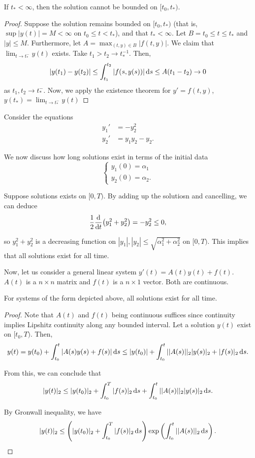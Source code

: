 \documentclass{article}
\begin{document}
\begin{theorem}[Claim.]{}
    If $t_* < \infty$, then the solution cannot be bounded on $[t_0, t_*)$.
\end{theorem}
\begin{proof}
    Suppose the solution remains bounded on $[t_0, t_*)$ (that is, $\sup|y(t)| = M < \infty$ on $t_0 \leq t < t_*$), and that $t_* < \infty$. Let $B = t_0 \leq t \leq t_*$ and $|y| \leq M$. Furthermore, let $A = \max_{(t, y) \in B} |f(t, y)|$. We claim that $\lim_{t \to t_*^{-}} y(t)$ exists. Take $t_1 > t_2 \to t_*^{-1}$. Then, 
    \[
        |y(t_1) - y(t_2)| \leq \int_{t_1}^{t_2} |f(s, y(s))| \, \text{d}s \leq A(t_1 - t_2) \to 0
    \]
    as $t_1, t_2 \to t_*^{-}$. Now, we apply the existence theorem for $y' = f(t, y)$, $y(t_*) = \lim_{t \to t_*^{-}} y(t)$
\end{proof}

\begin{example}
    Consider the equations
    \begin{align*}
        y_1' &= -y_2^2 \\
        y_2' &= y_1 y_2 - y_2.
    \end{align*}

    We now discuss how long solutions exist in terms of the initial data
    \[
        \begin{cases}
            y_1(0) = \alpha_1 \\
            y_2(0) = \alpha_2.
        \end{cases}
    \]

    Suppose solutions exists on $[0, T)$. By adding up the solutiosn and cancelling, we can deduce 
    \[
        \frac{1}{2} \dv{t} (y_1^2 + y_2^2) = -y_2^2 \leq 0,
    \]

    so $y_1^2 + y_2^2$ is a decreasing function on $|y_1|, |y_2| \leq \sqrt{\alpha_1^2 + \alpha_2^2}$ on $[0, T)$. This implies that all solutions exist for all time. 
\end{example}


Now, let us consider a general linear system $y'(t) = A(t) y(t) + f(t)$. $A(t)$ is a $n \times n$ matrix and $f(t)$ is a $n \times 1$ vector. Both are continuous. 

\begin{theorem}[Claim.]{}
    For systems of the form depicted above, all solutions exist for all time. 
\end{theorem}
\begin{proof}
    Note that $A(t)$ and $f(t)$ being continuous suffices since continuity implies Lipshitz continuity along any bounded interval. Let a solution $y(t)$ exist on $[t_0, T)$. Then, 
    \[
        y(t) = y(t_0) + \int_{t_0}^t |A(s)y(s) + f(s)| \, \text{d}s \leq |y(t_0)| + \int_{t_0}^t ||A(s)||_2 |y(s)|_2 + |f(s)|_2 \, \text{d}s.
    \] 

    From this, we can conclude that 
    \[
        |y(t)|_2 \leq |y(t_0)|_2 + \int_{t_0}^T |f(s)|_2 \, \text{d}s + \int_{t_0}^t ||A(s)||_2 |y(s)|_2 \, \text{d}s.
    \]

    By Gronwall inequality, we have 
    \[
        |y(t)|_2 \leq \left(|y(t_0)|_2 + \int_{t_0}^T |f(s)|_2 \, \text{d}s\right) \exp \left(\int_{t_0}^t ||A(s)||_2 \, \text{d}s \right).
    \]
\end{proof}
\end{document}
